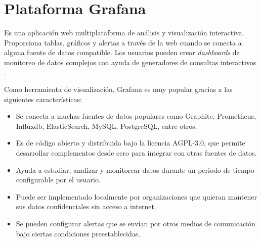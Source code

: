 \section{Plataforma Grafana}
Es una aplicación web multiplataforma de análisis y visualización interactiva. Proporciona tablas, gráficos y alertas a través de la web cuando se conecta a alguna fuente de datos compatible. Los usuarios pueden crear \textit{dashboards} de monitoreo de datos complejos con ayuda de generadores de consultas interactivos \cite{grafana_info}.

Como herramienta de visualización, Grafana es muy popular gracias a las siguientes características:
\begin{itemize}
	\item Se conecta a muchas fuentes de datos populares como Graphite, Prometheus, Influxdb, ElasticSearch, MySQL, PostgreSQL, entre otros.
	\item Es de código abierto y distribuida bajo la licencia AGPL-3.0, que permite desarrollar complementos desde cero para integrar con otras fuentes de datos.
	\item Ayuda a estudiar, analizar y monitorear datos durante un periodo de tiempo configurable por el usuario.
	\item Puede ser implementado localmente por organizaciones que quieran mantener sus datos confidenciales sin acceso a internet.
	\item Se pueden configurar alertas que se envían por otros medios de comunicación bajo ciertas condiciones preestablecidas.
\end{itemize}




